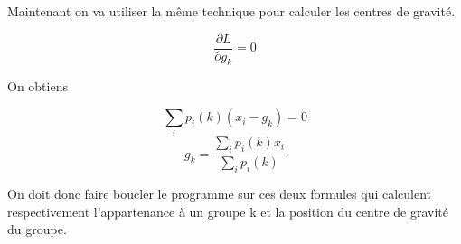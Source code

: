 \documentclass[a4paper, 11pt, onecolumn]{article}
\begin{document}
\begin{enumerate}
Maintenant on va utiliser la même technique pour calculer les centres de gravité.

$$\frac{\partial L}{\partial g_k} = 0$$

On obtiens

$$\sum_i p_i(k)(x_i-g_k) = 0$$
$$g_k = \frac{\sum_i p_i(k) x_i}{\sum_i p_i(k)}$$

On doit donc faire boucler le programme sur ces deux formules qui calculent respectivement l'appartenance à un groupe k et la position du centre de gravité du groupe.

\end{enumerate}
\end{document}
